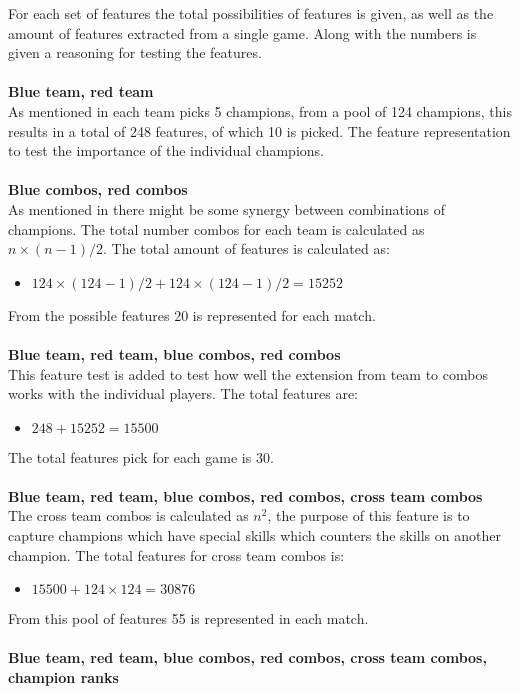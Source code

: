 For each set of features the total possibilities of features is given, as well as the amount of features extracted from a single game. Along with the numbers is given a reasoning for testing the features.  
\\\\
\textbf{Blue team, red team} \\
As mentioned in  each team picks 5 champions, from a pool of 124 champions, this results in a total of 248 features, of which 10 is picked. The feature representation to test the importance of the individual champions. \\\\
\textbf{Blue combos, red combos} \\
As mentioned in   there might be some synergy between combinations of champions. The total number combos for each team is calculated as $n \times (n-1)/2$. The total amount of features is calculated as:  
\begin{itemize}
\item $124 \times (124-1)/2 + 124 \times (124-1)/2 = 15252$
\end{itemize}
From the possible features $20$ is represented for each match. \\\\
\textbf{Blue team, red team, blue combos, red combos} \\
This feature test is added to test how well the extension from team to combos works with the individual players. The total features are: 
\begin{itemize}
\item $248 + 15252 = 15500$
\end{itemize}
The total features pick for each game is 30.\\\\
\textbf{Blue team, red team, blue combos, red combos, cross team combos}\\
The cross team combos is calculated as $n^2$, the purpose of this feature is to capture champions which have special skills which counters the skills on another champion. The total features for cross team combos is: 
\begin{itemize}
\item $15500+124\times124 = 30876$
\end{itemize}
From this pool of features 55 is represented in each match.\\\\
\textbf{Blue team, red team, blue combos, red combos, cross team combos, champion ranks}\\

